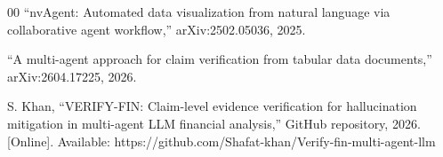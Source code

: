\documentclass[conference]{IEEEtran}
\begin{document}
\begin{thebibliography}{00}
 ``nvAgent: Automated data visualization from natural language via collaborative agent workflow,'' arXiv:2502.05036, 2025.

 ``A multi-agent approach for claim verification from tabular data documents,'' arXiv:2604.17225, 2026.

 S. Khan, ``VERIFY-FIN: Claim-level evidence verification for hallucination mitigation in multi-agent LLM financial analysis,'' GitHub repository, 2026. [Online]. Available: https://github.com/Shafat-khan/Verify-fin-multi-agent-llm

\end{thebibliography}
\end{document}

